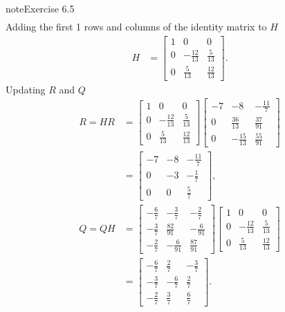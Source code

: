 \documentclass[letterpaper,10pt,english]{jupyterBook}
\begin{document}
\begin{sphinxadmonition}{note}{Exercise 6.5}
\begin{align*}
\end{align*}
\sphinxAtStartPar
Adding the first 1 rows and columns of the identity matrix to \(H\)
\begin{align*}
    H &= \left[\begin{matrix}1 & 0 & 0\\0 & - \frac{12}{13} & \frac{5}{13}\\0 & \frac{5}{13} & \frac{12}{13}\end{matrix}\right].
\end{align*}
\sphinxAtStartPar
Updating \(R\) and \(Q\)
\begin{align*}
    R = H R &= \left[\begin{matrix}1 & 0 & 0\\0 & - \frac{12}{13} & \frac{5}{13}\\0 & \frac{5}{13} & \frac{12}{13}\end{matrix}\right]\left[\begin{matrix}-7 & -8 & - \frac{11}{7}\\0 & \frac{36}{13} & \frac{37}{91}\\0 & - \frac{15}{13} & \frac{55}{91}\end{matrix}\right] \\
    &= \left[\begin{matrix}-7 & -8 & - \frac{11}{7}\\0 & -3 & - \frac{1}{7}\\0 & 0 & \frac{5}{7}\end{matrix}\right], \\
    Q = Q H &= \left[\begin{matrix}- \frac{6}{7} & - \frac{3}{7} & - \frac{2}{7}\\- \frac{3}{7} & \frac{82}{91} & - \frac{6}{91}\\- \frac{2}{7} & - \frac{6}{91} & \frac{87}{91}\end{matrix}\right]\left[\begin{matrix}1 & 0 & 0\\0 & - \frac{12}{13} & \frac{5}{13}\\0 & \frac{5}{13} & \frac{12}{13}\end{matrix}\right] \\
    &= \left[\begin{matrix}- \frac{6}{7} & \frac{2}{7} & - \frac{3}{7}\\- \frac{3}{7} & - \frac{6}{7} & \frac{2}{7}\\- \frac{2}{7} & \frac{3}{7} & \frac{6}{7}\end{matrix}\right].

\end{align*}
\end{sphinxadmonition}
\end{document}

